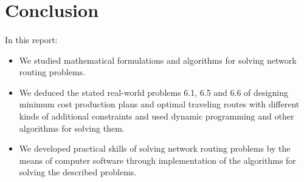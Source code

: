 \section{Conclusion}
	\paragraph{}
	In this report:
\begin{itemize}
	\item We studied mathematical formulations and algorithms for solving network routing problems.
	\item We deduced the stated real-world problems 6.1, 6.5 and 6.6 of designing minimum cost production plans and optimal traveling routes with different kinds of additional constraints and used dynamic programming and other algorithms for solving them.
	\item We developed practical skills of solving network routing problems by the means of computer software through implementation of the algorithms for solving the described problems.
\end{itemize}
